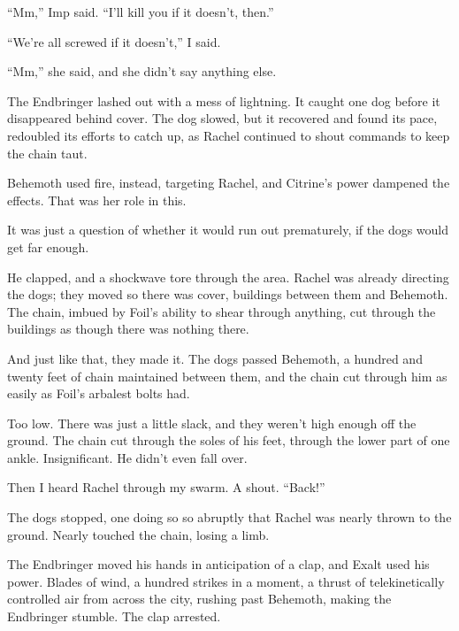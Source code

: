 ``Mm,'' Imp said.  ``I'll kill you if it doesn't, then.''



``We're all screwed if it doesn't,'' I said.



``Mm,'' she said, and she didn't say anything else.



The Endbringer lashed out with a mess of lightning.  It caught one dog before it disappeared behind cover.  The dog slowed, but it recovered and found its pace, redoubled its efforts to catch up, as Rachel continued to shout commands to keep the chain taut.



Behemoth used fire, instead, targeting Rachel, and Citrine's power dampened the effects.  That was her role in this.



It was just a question of whether it would run out prematurely, if the dogs would get far enough.



He clapped, and a shockwave tore through the area.  Rachel was already directing the dogs; they moved so there was cover, buildings between them and Behemoth.  The chain, imbued by Foil's ability to shear through anything, cut through the buildings as though there was nothing there.



And just like that, they made it.  The dogs passed Behemoth, a hundred and twenty feet of chain maintained between them, and the chain cut through him as easily as Foil's arbalest bolts had.



Too low.  There was just a little slack, and they weren't high enough off the ground.  The chain cut through the soles of his feet, through the lower part of one ankle.  Insignificant.  He didn't even fall over.



Then I heard Rachel through my swarm.  A shout.  ``Back!''



The dogs stopped, one doing so so abruptly that Rachel was nearly thrown to the ground.  Nearly touched the chain, losing a limb.



The Endbringer moved his hands in anticipation of a clap, and Exalt used his power.  Blades of wind, a hundred strikes in a moment, a thrust of telekinetically controlled air from across the city, rushing past Behemoth, making the Endbringer stumble.  The clap arrested.



